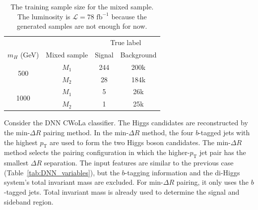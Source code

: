 \documentclass[12pt]{article}
\begin{document}
		\begin{table}[htpb]
			\centering
			\caption{The training sample size for the mixed sample. The luminosity is $\mathcal{L} = 78 \text{ fb}^{-1}$ because the generated samples are not enough for now.}
			\label{tab:training_sample_size_cwola_hunting}
			\begin{tabular}{c|c|cc}
									  &              & \multicolumn{2}{c}{True label} \\
				$m_H$ (GeV)           & Mixed sample & Signal       & Background      \\ \hline
				\multirow{2}{*}{500}  & $M_1$        & 244          & 200k            \\
									  & $M_2$        & 28           & 184k            \\ \hline
				\multirow{2}{*}{1000} & $M_1$        & 5            & 26k             \\
									  & $M_2$        & 1            & 25k            
			\end{tabular}
		\end{table}

		Consider the DNN CWoLa classifier. The Higgs candidates are reconstructed by the $\text{min-}\Delta R$ pairing method. In the $\text{min-}\Delta R$ method, the four $b$-tagged jets with the highest $p_{\text{T}}$ are used to form the two Higgs boson candidates. The $\text{min-}\Delta R$ method selects the pairing configuration in which the higher-$p_{\text{T}}$ jet pair has the smallest $\Delta R$ separation. The input features are similar to the previous case (Table~\ref{tab:DNN_variables}), but the $b$-tagging information and the di-Higgs system's total invariant mass are excluded. For $\text{min-}\Delta R$ pairing, it only uses the $b$-tagged jets. Total invariant mass is already used to determine the signal and sideband region.

\end{document}
